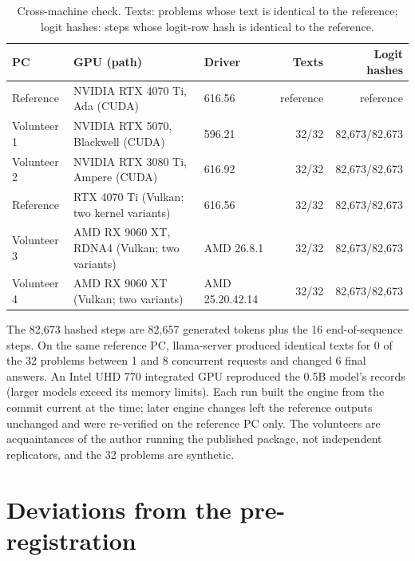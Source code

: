 \documentclass[11pt]{article}
\begin{document}
\begin{table}[ht]
\centering
\small
\caption{Cross-machine check. Texts: problems whose text is identical to the reference; logit hashes: steps whose
logit-row hash is identical to the reference.}
\label{tab:cross}
\begin{tabularx}{\textwidth}{@{}l Y l r r@{}}
\toprule
PC & GPU (path) & Driver & Texts & Logit hashes \\
\midrule
Reference & NVIDIA RTX 4070 Ti, Ada (CUDA) & 616.56 & reference & reference \\
Volunteer 1 & NVIDIA RTX 5070, Blackwell (CUDA) & 596.21 & 32/32 & 82,673/82,673 \\
Volunteer 2 & NVIDIA RTX 3080 Ti, Ampere (CUDA) & 616.92 & 32/32 & 82,673/82,673 \\
Reference & RTX 4070 Ti (Vulkan; two kernel variants) & 616.56 & 32/32 & 82,673/82,673 \\
Volunteer 3 & AMD RX 9060 XT, RDNA4 (Vulkan; two variants) & AMD 26.8.1 & 32/32 & 82,673/82,673 \\
Volunteer 4 & AMD RX 9060 XT (Vulkan; two variants) & AMD 25.20.42.14 & 32/32 & 82,673/82,673 \\
\bottomrule
\end{tabularx}
\end{table}

The 82,673 hashed steps are 82,657 generated tokens plus the 16 end-of-sequence steps. On the same reference PC,
llama-server produced identical texts for 0 of the 32 problems between 1 and 8 concurrent requests and changed 6 final
answers. An Intel UHD 770 integrated GPU reproduced the 0.5B model's records (larger models exceed its memory limits). Each
run built the engine from the commit current at the time; later engine changes left the reference outputs unchanged and were
re-verified on the reference PC only. The volunteers are acquaintances of the author running the published package, not
independent replicators, and the 32 problems are synthetic.

\section{Deviations from the pre-registration}\label{app:dev}
\end{document}
